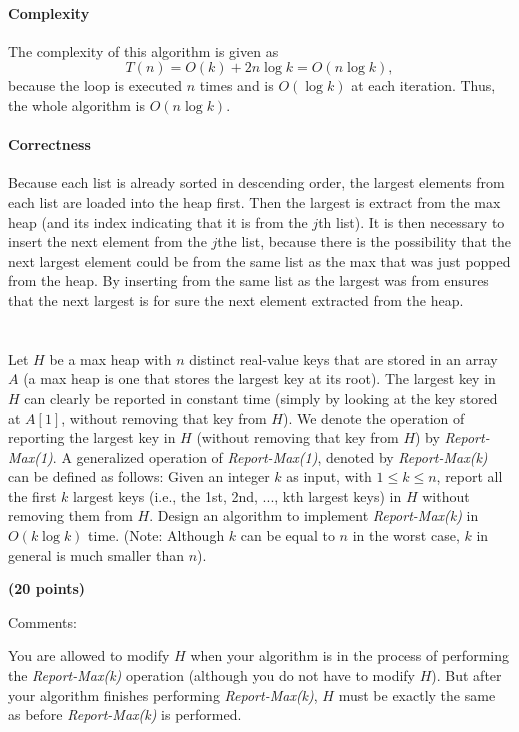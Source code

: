 \documentclass{article}
\begin{document}
\paragraph{Complexity}
The complexity of this algorithm is given as
\begin{equation}
  T(n) = O(k) + 2n\log k = O(n\log k),
\end{equation}
because the loop is executed $n$ times and is $O(\log k)$ at each
iteration.  Thus, the whole algorithm is $O(n\log k)$.

\paragraph{Correctness}
Because each list is already sorted in descending order, the largest
elements from each list are loaded into the heap first.  Then the
largest is extract from the max heap (and its index indicating that it
is from the $j$th list).  It is then necessary to insert
the next element from the $j$the list, because there is the
possibility that the next largest element could be from the same list
as the max that was just popped from the heap.  By inserting from the
same list as the largest was from ensures that the next largest is for
sure the next element extracted from the heap. 



\section{}
 Let $H$ be a max heap with $n$ distinct real-value keys that are
 stored in an array $A$ (a max heap is one that stores the largest key
 at its root). The largest key in $H$ can clearly be reported in
 constant time (simply by looking at the key stored at $A[1]$, without
 removing that key from $H$). We denote the operation of reporting the
 largest key in $H$ (without removing that key from $H$) by
 \emph{Report-Max(1)}. A generalized operation of
 \emph{Report-Max(1)}, denoted by \emph{Report-Max(k)} can be defined
 as follows: Given an integer $k$ as input, with $1 \le k \le n$,
 report all the first $k$ largest keys (i.e., the 1st, 2nd, ..., kth
 largest keys) in $H$ without removing them from $H$. Design an
 algorithm to implement \emph{Report-Max(k)} in $O(k\log k)$
 time. (Note: Although $k$ can be equal to $n$ in the worst case, $k$
 in general is much smaller than $n$). {\bf (20 points)

Comments:} You are allowed to modify $H$ when your algorithm is in the
process of performing the \emph{Report-Max(k)} operation (although you
do not have to modify $H$). But after your algorithm finishes
performing \emph{Report-Max(k)}, $H$ must be exactly the same as
before \emph{Report-Max(k)} is performed.
\end{document}
